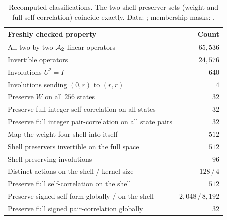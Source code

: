 \begin{table}[htbp]
\centering\small
\begin{tabularx}{\textwidth}{@{}Y r@{}}
\toprule
Freshly checked property & Count\\
\midrule
All two-by-two $\mathcal A_2$-linear operators & $65{,}536$\\
Invertible operators & $24{,}576$\\
Involutions $U^2=I$ & $640$\\
Involutions sending $(0,r)$ to $(r,r)$ & $4$\\
Preserve $W$ on all $256$ states & $32$\\
Preserve full integer self-correlation on all states & $32$\\
Preserve full integer pair-correlation on all state pairs & $32$\\
Map the weight-four shell into itself & $512$\\
Shell preservers invertible on the full space & $512$\\
Shell-preserving involutions & $96$\\
Distinct actions on the shell / kernel size & $128\,/\,4$\\
Preserve full self-correlation on the shell & $512$\\
Preserve signed self-form globally / on the shell & $2{,}048\,/\,8{,}192$\\
Preserve full signed pair-correlation globally & $32$\\
\bottomrule
\end{tabularx}
\caption{Recomputed classifications. The two shell-preserver sets (weight and full self-correlation) coincide exactly. Data: ; membership masks: .}
\label{tab:finite}
\end{table}


